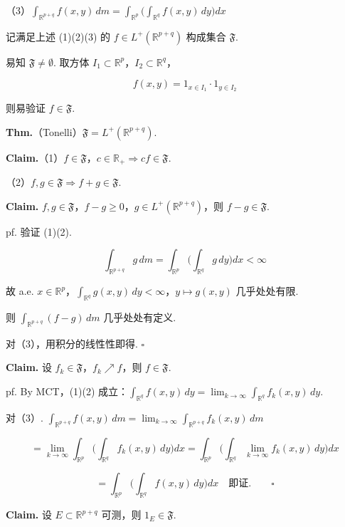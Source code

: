 \documentclass[11pt]{ctexart}
\theoremstyle{definition}
\begin{document}
（3）$\displaystyle\int_{\mathbb{R}^{p+q}} f(x, y) \, dm = \int_{\mathbb{R}^p} \Big( \int_{\mathbb{R}^q} f(x, y) \, dy \Big) dx$

记满足上述 (1)(2)(3) 的 $f \in L^+(\mathbb{R}^{p+q})$ 构成集合 $\mathfrak{F}$.

易知 $\mathfrak{F} \neq \emptyset$. 取方体 $I_1 \subset \mathbb{R}^p$，$I_2 \subset \mathbb{R}^q$，

\[
f(x, y) = 1_{x \in I_1} \cdot 1_{y \in I_2}
\]

则易验证 $f \in \mathfrak{F}$.

\textbf{Thm.}（Tonelli）$\mathfrak{F} = L^+(\mathbb{R}^{p+q})$.

\textbf{Claim.}（1）$f \in \mathfrak{F}$，$c \in \mathbb{R}_+ \Rightarrow cf \in \mathfrak{F}$.

（2）$f, g \in \mathfrak{F} \Rightarrow f + g \in \mathfrak{F}$.

\textbf{Claim.} $f, g \in \mathfrak{F}$，$f - g \geq 0$，$g \in L^+(\mathbb{R}^{p+q})$，则 $f - g \in \mathfrak{F}$.

pf. 验证 (1)(2).

\[
\int_{\mathbb{R}^{p+q}} g \, dm = \int_{\mathbb{R}^p} \Big( \int_{\mathbb{R}^q} g \, dy \Big) dx < \infty
\]

故 a.e. $x \in \mathbb{R}^p$，$\displaystyle\int_{\mathbb{R}^q} g(x, y)\, dy < \infty$，$y \mapsto g(x, y)$ 几乎处处有限.

则 $\displaystyle\int_{\mathbb{R}^{p+q}} (f - g)\, dm$ 几乎处处有定义.

对（3），用积分的线性性即得. $\square$

\textbf{Claim.} 设 $f_k \in \mathfrak{F}$，$f_k \nearrow f$，则 $f \in \mathfrak{F}$.

pf. By MCT，(1)(2) 成立：$\displaystyle\int_{\mathbb{R}^q} f(x, y)\, dy = \lim_{k \to \infty} \int_{\mathbb{R}^q} f_k(x, y)\, dy$.

对（3）. $\displaystyle\int_{\mathbb{R}^{p+q}} f(x, y)\, dm = \lim_{k \to \infty} \int_{\mathbb{R}^{p+q}} f_k(x, y)\, dm$

\[
= \lim_{k \to \infty} \int_{\mathbb{R}^p} \Big( \int_{\mathbb{R}^q} f_k(x, y)\, dy \Big) dx = \int_{\mathbb{R}^p} \Big( \int_{\mathbb{R}^q} \lim_{k \to \infty} f_k(x, y)\, dy \Big) dx
\]

\[
= \int_{\mathbb{R}^p} \Big( \int_{\mathbb{R}^q} f(x, y)\, dy \Big) dx \quad \text{即证.} \qquad \square
\]

\textbf{Claim.} 设 $E \subset \mathbb{R}^{p+q}$ 可测，则 $1_E \in \mathfrak{F}$.
\end{document}
